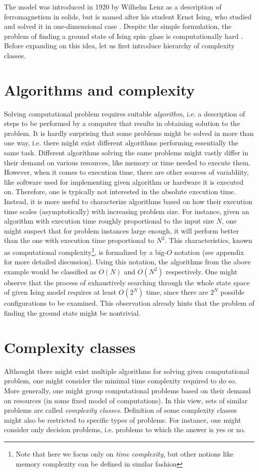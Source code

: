 The model was introduced in 1920 by Wilhelm Lenz \cite{lenz} as a description of ferromagnetism in solids, but is named after his student Ernst Ising, who studied and solved it in one-dimensional case \cite{ising}.  Despite the simple formulation, the problem of finding a ground state of Ising spin--glass is computationally hard \cite{barahoma}. Before expanding on this idea, let us first introduce hierarchy of complexity classes.

\section{Algorithms and complexity}
Solving computational problem requires suitable \emph{algorithm}, i.e. a description of steps to be performed by a computer that results in obtaining solution to the problem. It is hardly surprising that some problems might be solved in more than one way, i.e. there might exist different algorithms performing essentially the same task. Different algorithms solving the same problems might vastly differ in their demand on various resources, like memory or time needed to execute them. However, when it comes to execution time, there are other sources of variabliity, like software used for implementing given algorithm or hardware it is executed on. Therefore, one is typically not interested in the absolute execution time. Instead, it is more useful to characterize algorithms based on how their execution time scales (asymptotically) with increasing problem size. For instance, given an algorithm with execution time roughly proportional to the input size $N$, one might suspect that for problem instances large enough, it will perform better than the one with execution time proportional to $N^{2}$. This characteristics, known as computational complexity\footnote{Note that here we focus only on \emph{time complexity}, but other notions like memory complexity can be defined in similar fashion}, is formalized by a big-$O$ notation (see appendix for more detailed discussion). Using this notation, the algorithms from the above example would be classified as $O(N)$ and $O(N^{2})$ respectively. One might observe that the process of exhaustively searching through the whole state space of given Ising model requires at least $O(2^{N})$ time, since there are $2^{N}$ possible configurations to be examined. This observation already hints that the problem of finding the ground state might be nontrivial.

\section{Complexity classes}
Althought there might exist multiple algorithms for solving given computational problem, one might consider the minimal time complexity required to do so. More generally, one might group computational problems based on their demand on resources (in some fixed model of computations). In this view, sets of similar problems are called \emph{complexity classes}. Definition of some complexity classes might also be restricted to specific types of problems. For instance, one might consider only decision problems, i.e. problems to which the answer is yes or no.

